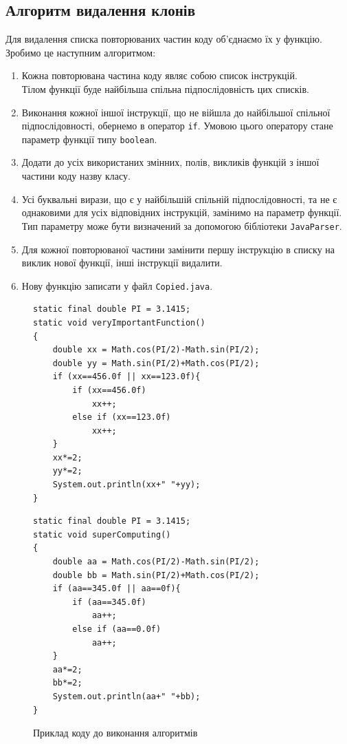 \documentclass[a4paper, 14pt]{article}
\begin{document}
\subsection{Алгоритм видалення клонів}
Для видалення списка повторюваних частин коду об'єднаємо їх у функцію. \\
Зробимо це наступним алгоритмом: 
\begin{enumerate}
\item Кожна повторювана частина коду являє собою список інструкцій. \\
Тілом функції буде найбільша спільна підпослідовність цих списків.
\item Виконання кожної іншої інструкції, що не війшла до найбільшої спільної підпослідовності, обернемо в оператор \verb|if|.
Умовою цього оператору стане параметр функції типу \verb|boolean|.
\item Додати до усіх використаних змінних, полів, викликів функцій з іншої частини коду назву класу.
\item Усі буквальні вирази, що є у найбільшій спільній підпослідовності, та не є однаковими для усіх відповідних інструкцій, замінимо на параметр функції. Тип параметру може бути визначений за допомогою бібліотеки \verb|JavaParser|.
\item Для кожної повторюваної частини замінити першу інструкцію в списку на виклик нової функції, інші інструкції видалити.
\item Нову функцію записати у файл \verb|Copied.java|.
\end{enumerate}
\newpage
\begin{figure}[h!]
\centering
\begin{minipage}{.45\textwidth}
\begin{lstlisting}[frame=none]
static final double PI = 3.1415;
static void veryImportantFunction()
{
	double xx = Math.cos(PI/2)-Math.sin(PI/2);
	double yy = Math.sin(PI/2)+Math.cos(PI/2);
	if (xx==456.0f || xx==123.0f){
		if (xx==456.0f)
			xx++;
		else if (xx==123.0f)
			xx++;
	}
	xx*=2;
	yy*=2;
	System.out.println(xx+" "+yy);
}
\end{lstlisting}
\end{minipage}
\begin{minipage}{.45\textwidth}
\begin{lstlisting}[frame=none]
static final double PI = 3.1415;
static void superComputing()
{
	double aa = Math.cos(PI/2)-Math.sin(PI/2);
	double bb = Math.sin(PI/2)+Math.cos(PI/2);
	if (aa==345.0f || aa==0f){
		if (aa==345.0f)
			aa++;
		else if (aa==0.0f)
			aa++;
	}
	aa*=2;
	bb*=2;
	System.out.println(aa+" "+bb);
}
\end{lstlisting}
\end{minipage}
\caption{Приклад коду до виконання алгоритмів}
\end{figure}
\end{document}
